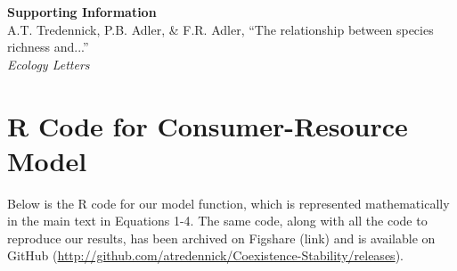\documentclass[11pt,]{article}
\title{}
\author{}
\date{}
\begin{document}
\newcommand{\tikzcircle}[2][red,fill=red]{\tikz[baseline=-0.5ex]\draw[#1,radius=#2] (0,0) circle ;}
\renewcommand\linenumberfont{\normalfont\tiny\sffamily\color{gray}}
\renewcommand\thefigure{SI-\arabic{figure}}  
\renewcommand\thetable{SI-\arabic{table}}  
\renewcommand\thesection{Section SI.\arabic{section}}

\begin{center}
\textbf{\Large{Supporting Information}} \\
A.T. Tredennick, P.B. Adler, \& F.R. Adler, ``The relationship between species richness and...'' \\
\emph{Ecology Letters}
\end{center}

\section{R Code for Consumer-Resource Model}

Below is the R code for our model function, which is represented
mathematically in the main text in Equations 1-4. The same code, along
with all the code to reproduce our results, has been archived on
Figshare (link) and is available on GitHub
(\url{http://github.com/atredennick/Coexistence-Stability/releases}).
\end{document}
